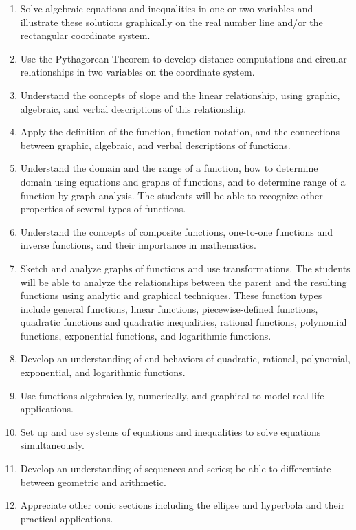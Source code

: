 \documentclass[11pt]{article}
\newenvironment{alphalist}{
\begin{enumerate}[label=(\arabic*),widest=107 ,leftmargin=25pt, itemsep=0pt]}
{\end{enumerate}}
\begin{document}
\begin{alphalist}

\item Solve algebraic equations and inequalities in one or two variables and illustrate these solutions graphically on the real number line and/or the rectangular coordinate system. 

\item Use the Pythagorean Theorem to develop distance computations and circular relationships in two variables on the coordinate system. 

\item   Understand the concepts of slope and the linear relationship, using graphic, algebraic, and verbal descriptions of this relationship. 

\item Apply the definition of the function, function notation, and the connections between graphic, algebraic, and verbal descriptions of functions. 

\item  Understand the domain and the range of a function, how to determine domain using equations and graphs of functions, and to determine range of a function by graph analysis. The students will be able to recognize other properties of several types of functions. 

\item   Understand the concepts of composite functions, one-to-one functions and inverse functions, and their importance in mathematics. 

\item  Sketch and analyze graphs of functions and use transformations.  The students will be able to analyze the relationships between the parent and the resulting functions using analytic and graphical techniques. These function types include general functions, linear functions, piecewise-defined functions, quadratic functions and quadratic inequalities, rational functions, polynomial functions, exponential functions, and logarithmic functions. 

\item   Develop an understanding of end behaviors of quadratic, rational, polynomial, exponential, and logarithmic functions. 

\item   Use functions algebraically, numerically, and graphical to model real life applications. 

\item   Set up and use systems of equations and inequalities to solve equations simultaneously.  

\item   Develop an understanding of sequences and series; be able to differentiate between geometric and arithmetic.  

\item   Appreciate other conic sections including the ellipse and hyperbola and their practical applications.  

\end{alphalist}
\end{document}
